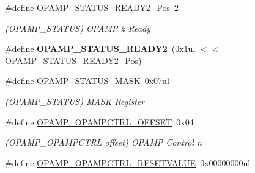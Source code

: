 \begin{DoxyCompactItemize}
\item 
\hypertarget{group___s_a_m_l21___o_p_a_m_p_ga559309b8bc362889764e5e78e09879a0}{}\#define \hyperlink{group___s_a_m_l21___o_p_a_m_p_ga559309b8bc362889764e5e78e09879a0}{O\+P\+A\+M\+P\+\_\+\+S\+T\+A\+T\+U\+S\+\_\+\+R\+E\+A\+D\+Y2\+\_\+\+Pos}~2\label{group___s_a_m_l21___o_p_a_m_p_ga559309b8bc362889764e5e78e09879a0}

\begin{DoxyCompactList}\small\item\em (O\+P\+A\+M\+P\+\_\+\+S\+T\+A\+T\+U\+S) O\+P\+A\+M\+P 2 Ready \end{DoxyCompactList}\item 
\hypertarget{group___s_a_m_l21___o_p_a_m_p_gae436d31b23db74e77bc1a2360cea768b}{}\#define {\bfseries O\+P\+A\+M\+P\+\_\+\+S\+T\+A\+T\+U\+S\+\_\+\+R\+E\+A\+D\+Y2}~(0x1ul $<$$<$ O\+P\+A\+M\+P\+\_\+\+S\+T\+A\+T\+U\+S\+\_\+\+R\+E\+A\+D\+Y2\+\_\+\+Pos)\label{group___s_a_m_l21___o_p_a_m_p_gae436d31b23db74e77bc1a2360cea768b}

\item 
\hypertarget{group___s_a_m_l21___o_p_a_m_p_ga82587170ba53e8d2151ac64958310628}{}\#define \hyperlink{group___s_a_m_l21___o_p_a_m_p_ga82587170ba53e8d2151ac64958310628}{O\+P\+A\+M\+P\+\_\+\+S\+T\+A\+T\+U\+S\+\_\+\+M\+A\+S\+K}~0x07ul\label{group___s_a_m_l21___o_p_a_m_p_ga82587170ba53e8d2151ac64958310628}

\begin{DoxyCompactList}\small\item\em (O\+P\+A\+M\+P\+\_\+\+S\+T\+A\+T\+U\+S) M\+A\+S\+K Register \end{DoxyCompactList}\item 
\hypertarget{group___s_a_m_l21___o_p_a_m_p_ga34e004a2f3386392edba83b0491c0f0e}{}\#define \hyperlink{group___s_a_m_l21___o_p_a_m_p_ga34e004a2f3386392edba83b0491c0f0e}{O\+P\+A\+M\+P\+\_\+\+O\+P\+A\+M\+P\+C\+T\+R\+L\+\_\+\+O\+F\+F\+S\+E\+T}~0x04\label{group___s_a_m_l21___o_p_a_m_p_ga34e004a2f3386392edba83b0491c0f0e}

\begin{DoxyCompactList}\small\item\em (O\+P\+A\+M\+P\+\_\+\+O\+P\+A\+M\+P\+C\+T\+R\+L offset) O\+P\+A\+M\+P Control n \end{DoxyCompactList}\item 
\hypertarget{group___s_a_m_l21___o_p_a_m_p_gaa1f8faf70d743c1952716b70c56bffe8}{}\#define \hyperlink{group___s_a_m_l21___o_p_a_m_p_gaa1f8faf70d743c1952716b70c56bffe8}{O\+P\+A\+M\+P\+\_\+\+O\+P\+A\+M\+P\+C\+T\+R\+L\+\_\+\+R\+E\+S\+E\+T\+V\+A\+L\+U\+E}~0x00000000ul\label{group___s_a_m_l21___o_p_a_m_p_gaa1f8faf70d743c1952716b70c56bffe8}


\end{DoxyCompactItemize}
